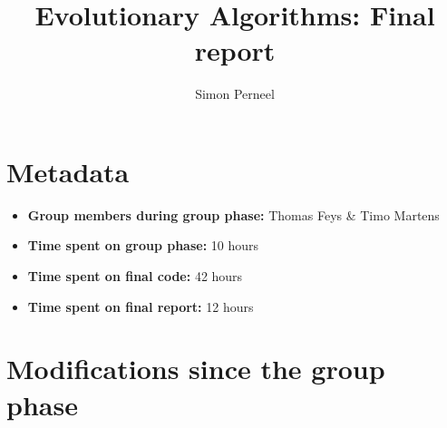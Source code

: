 \documentclass[a4paper,10pt]{article}
\title{Evolutionary Algorithms: Final report}
\author{Simon Perneel}
\newcommand{\nextyear}{\advance\year by 1 \the\year\advance\year by -1}
\newcommand{\deadlineReport}{January 4, \nextyear{} at 16:00 CET}
\newcommand{\RemoveMe}[1]{{\color{purple}#1}}
\begin{document}
\selectfont{} 
\setlength\parindent{0pt} %

\maketitle





\section{Metadata}

\begin{itemize}
 \item \textbf{Group members during group phase:} Thomas Feys \& Timo Martens
 \item \textbf{Time spent on group phase:} 10 hours
 \item \textbf{Time spent on final code:} 42 hours
 \item \textbf{Time spent on final report:} 12 hours
\end{itemize}

\section{Modifications since the group phase}
\end{document}
